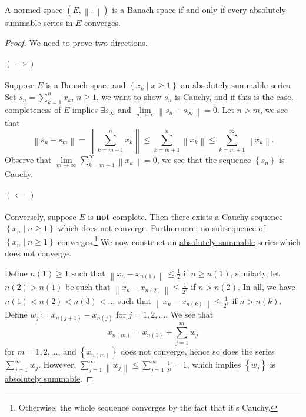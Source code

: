 \begin{theorem}\label{thm:criterion-for-completeness}
	A \hyperref[def:normed-vector-space]{normed space} \(( E, \left\lVert \cdot\right\rVert )\) is a \hyperref[def:Banach-space]{Banach space} if and only if every absolutely summable series in \(E\) converges.
\end{theorem}
\begin{proof}
	We need to prove two directions.

	\paragraph{\((\implies )\)}
	Suppose \(E\) is a \hyperref[def:Banach-space]{Banach space} and \(\left\{ x_{k}\mid x \geq 1 \right\} \) an \hyperref[def:absolutely-summable]{absolutely summable} series. Set \(s_n = \sum_{k=1}^{n} x_{k} \), \(n \geq 1\), we want to show \(s_n\) is Cauchy, and if this is the case, completeness of \(E\) implies \(\exists s_{\infty }\) and \(\lim\limits_{n \to \infty} \left\lVert s_n - s_{\infty }\right\rVert = 0\). Let \(n > m\), we see that
	\[
		\left\lVert s_n - s_m\right\rVert = \left\lVert \sum_{k=m+1}^{n} x_k\right\rVert \leq \sum_{k=m+1}^{n} \left\lVert x_k\right\rVert \leq \sum_{k=m+1}^{\infty} \left\lVert x_k\right\rVert.
	\]
	Observe that \(\lim\limits_{m \to \infty} \sum\limits_{k=m+1}^{\infty} \left\lVert x_k\right\rVert = 0\), we see that the sequence \(\left\{ s_n \right\} \) is Cauchy.

	\paragraph{\((\impliedby)\)}
	Conversely, suppose \(E\) is \textbf{not} complete. Then there exists a Cauchy sequence \(\left\{ x_n \mid n \geq 1 \right\} \) which does not converge. Furthermore, no subsequence of \(\left\{ x_n \mid n \geq 1 \right\} \) converges.\footnote{Otherwise, the whole sequence converges by the fact that it's Cauchy.} We now construct an \hyperref[def:absolutely-summable]{absolutely summable} series which does not converge.

	Define \(n(1) \geq 1\) such that \(\left\lVert x_n - x_{n(1)}\right\rVert \leq \frac{1}{2}\) if \(n \geq n(1)\), similarly, let \(n(2) > n(1)\) be such that \(\left\lVert x_n - x_{n(2)}\right\rVert \leq \frac{1}{2^2}\) if \( n > n(2)\). In all, we have \(n(1) < n(2) < n(3) < \ldots  \) such that \(\left\lVert x_n - x_{n(k)}\right\rVert \leq \frac{1}{2^k}\) if \(n > n(k)\). Define \(w_j \coloneqq x_{n(j+1)} - x_{n(j)}\) for \(j = 1, 2, \ldots  \). We see that
	\[
		x_{n(m)} = x_{n(1)} + \sum_{j=1}^{m} w_j
	\]
	for \(m = 1, 2, \ldots\), and \(\left\{ x_{n(m)} \right\} \) does not converge, hence so does the series \(\sum_{j=1}^{\infty} w_j\). However, \(\sum_{j=1}^{\infty} \left\lVert w_j\right\rVert \leq \sum_{j=1}^{\infty} \frac{1}{2^j} = 1\), which implies \(\left\{ w_j \right\} \) is \hyperref[def:absolutely-summable]{absolutely summable}.
\end{proof}

